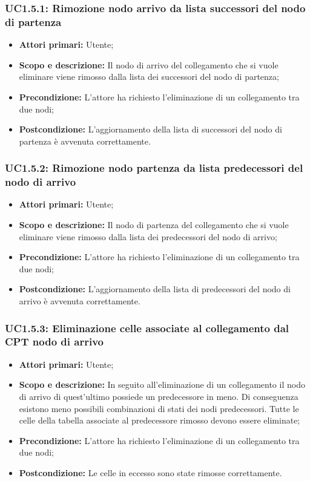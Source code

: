 \subsubsection{UC1.5.1: Rimozione nodo arrivo da lista successori del nodo di partenza} 
\begin{itemize} 
	\item{\textbf{Attori primari:} Utente;} 
	\item{\textbf{Scopo e descrizione:} Il nodo di arrivo del collegamento che si vuole eliminare viene rimosso dalla lista dei successori del nodo di partenza;} 
	\item{\textbf{Precondizione:} L'attore ha richiesto l'eliminazione di un collegamento tra due nodi;} 
	\item{\textbf{Postcondizione:} L'aggiornamento della lista di successori del nodo di partenza è avvenuta correttamente.} 
\end{itemize} 
\subsubsection{UC1.5.2: Rimozione nodo partenza da lista predecessori del nodo di arrivo} 
\begin{itemize} 
	\item{\textbf{Attori primari:} Utente;} 
	\item{\textbf{Scopo e descrizione:} Il nodo di partenza del collegamento che si vuole eliminare viene rimosso dalla lista dei predecessori del nodo di arrivo;} 
	\item{\textbf{Precondizione:} L'attore ha richiesto l'eliminazione di un collegamento tra due nodi;} 
	\item{\textbf{Postcondizione:} L'aggiornamento della lista di predecessori del nodo di arrivo è avvenuta correttamente.} 
\end{itemize} 
\subsubsection{UC1.5.3: Eliminazione celle associate al collegamento dal CPT nodo di arrivo} 
\begin{itemize} 
	\item{\textbf{Attori primari:} Utente;} 
	\item{\textbf{Scopo e descrizione:} In seguito all'eliminazione di un collegamento il nodo di arrivo di quest'ultimo possiede un predecessore in meno. Di conseguenza esistono meno possibili combinazioni di stati dei nodi predecessori. Tutte le celle della tabella associate al predecessore rimosso devono essere eliminate;} 
	\item{\textbf{Precondizione:} L'attore ha richiesto l'eliminazione di un collegamento tra due nodi;} 
	\item{\textbf{Postcondizione:} Le celle in eccesso sono state rimosse correttamente.} 
\end{itemize} 
